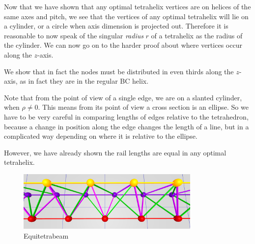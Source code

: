 \documentclass[review]{siamonline1116}
\begin{document}


Now that we have shown that any optimal tetrahelix vertices
are on helices of the same axes and pitch, we see that the vertices 
of any optimal tetrahelix will lie on a cylinder, or a circle when axis dimension
is projected out. Therefore it is reasonable to now speak of the singular \emph{radius} $r$
of a tetrahelix as the radius of the cylinder.
We can now go on to
the harder proof about where vertices occur along the $z$-axis.

 We show that in fact the nodes must be distributed in even thirds
 along the $z$-axis, as in fact they are in the regular BC helix.

 Note that from the point of view of a single edge, we are on a
 slanted cylinder, when $\rho \neq 0$.  This means from its point of
 view a cross section is an ellipse. So we have to be very careful in
 comparing lengths of edges relative to the tetrahedron, because a
 change in position along the edge changes the length of a line, but
 in a complicated way depending on where it is relative to the
 ellipse.

 However, we have already shown the rail
 lengths are equal in any optimal tetrahelix.

\begin{figure}[H]
     \centering
     \includegraphics[width=0.8\textwidth]{figures/EquitetrabeamCloseUp.png}
     \caption{Equitetrabeam}
  \label{fig:equitetrabeam}
\end{figure}
\end{document}

